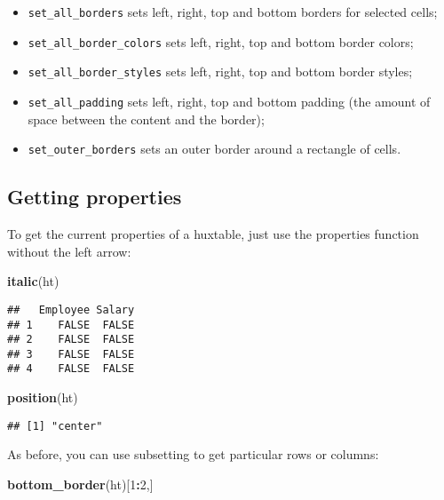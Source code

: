 \documentclass[]{article}
\newenvironment{Shaded}{\begin{snugshade}}{\end{snugshade}}
\newcommand{\DecValTok}[1]{\textcolor[rgb]{0.00,0.00,0.81}{#1}}
\newcommand{\KeywordTok}[1]{\textcolor[rgb]{0.13,0.29,0.53}{\textbf{#1}}}
\newcommand{\NormalTok}[1]{#1}
\newcommand{\OperatorTok}[1]{\textcolor[rgb]{0.81,0.36,0.00}{\textbf{#1}}}
\providecommand{\tightlist}{%
  \setlength{\itemsep}{0pt}\setlength{\parskip}{0pt}}
\begin{document}
\begin{itemize}
\tightlist
\item
  \texttt{set\_all\_borders} sets left, right, top and bottom borders
  for selected cells;
\item
  \texttt{set\_all\_border\_colors} sets left, right, top and bottom
  border colors;
\item
  \texttt{set\_all\_border\_styles} sets left, right, top and bottom
  border styles;
\item
  \texttt{set\_all\_padding} sets left, right, top and bottom padding
  (the amount of space between the content and the border);
\item
  \texttt{set\_outer\_borders} sets an outer border around a rectangle
  of cells.
\end{itemize}

\hypertarget{getting-properties}{%
\subsection{Getting properties}\label{getting-properties}}

To get the current properties of a huxtable, just use the properties
function without the left arrow:

\begin{Shaded}
\begin{Highlighting}[]
\KeywordTok{italic}\NormalTok{(ht)}
\end{Highlighting}
\end{Shaded}

\begin{verbatim}
##   Employee Salary
## 1    FALSE  FALSE
## 2    FALSE  FALSE
## 3    FALSE  FALSE
## 4    FALSE  FALSE
\end{verbatim}

\begin{Shaded}
\begin{Highlighting}[]
\KeywordTok{position}\NormalTok{(ht)}
\end{Highlighting}
\end{Shaded}

\begin{verbatim}
## [1] "center"
\end{verbatim}

\FloatBarrier

As before, you can use subsetting to get particular rows or columns:

\begin{Shaded}
\begin{Highlighting}[]
\KeywordTok{bottom_border}\NormalTok{(ht)[}\DecValTok{1}\OperatorTok{:}\DecValTok{2}\NormalTok{,]}
\end{Highlighting}
\end{Shaded}
\end{document}
